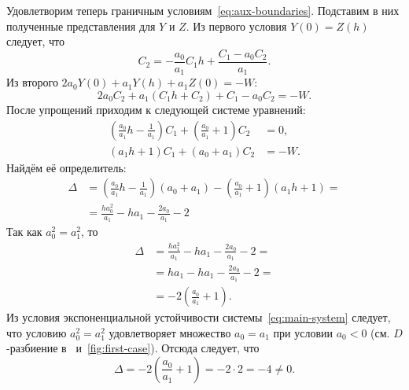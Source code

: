 \documentclass[a4paper,14pt]{article}
\begin{document}
Удовлетворим теперь граничным условиям~\eqref{eq:aux-boundaries}.
Подставим в них полученные представления для $Y$ и $Z$. Из
первого условия $Y(0) = Z(h)$ следует, что
\begin{equation*}
  C_2 =
  - \frac{a_0}{a_1} C_1 h
  + \frac{C_1 - a_0 C_2}{a_1}.
\end{equation*}
Из второго $2 a_0 Y(0) + a_1 Y(h) + a_1 Z(0) = -W$:
\begin{equation*}
  2 a_0 C_2 + a_1 (C_1 h + C_2) + C_1 - a_0 C_2 = -W.
\end{equation*}
После упрощений приходим к следующей системе уравнений:
\begin{equation*}
  \begin{aligned}
    \left(
    \frac{a_0}{a_1} h - \frac{1}{a_1}
    \right) C_1
    + \left(
    \frac{a_0}{a_1} + 1
    \right) C_2 &= 0, \\
    (a_1 h + 1) C_1 + (a_0 + a_1) C_2 &= -W.
  \end{aligned}
\end{equation*}
Найдём её определитель:
\begin{equation*}
  \begin{aligned}
    \Delta
    &=
      \left(
      \frac{a_0}{a_1} h - \frac{1}{a_1}
      \right)
      (a_0 + a_1)
      -
      \left(
      \frac{a_0}{a_1} + 1
      \right)
      (a_1 h + 1) = \\
    &=
      \frac{h a_0^2}{a_1} - h a_1
      - \frac{2 a_0}{a_1} - 2
  \end{aligned}
\end{equation*}
Так как $a_0^2 = a_1^2$, то
\begin{equation*}
  \begin{aligned}
    \Delta
    &=
      \frac{h a_1^2}{a_1} - h a_1
      - \frac{2 a_0}{a_1} - 2 = \\
    &=
      h a_1 - h a_1 - \frac{2 a_0}{a_1} - 2 = \\
    &=
      - 2 \left(
      \frac{a_0}{a_1} + 1
      \right).
  \end{aligned}
\end{equation*}
Из условия экспоненциальной устойчивости системы~\eqref{eq:main-system} следует,
что условию $a_0^2 = a_1^2$ удовлетворяет множество $a_0 = a_1$ при условии
$a_0 < 0$ (см. $D$-разбиение в~\cite[стр.~126]{elsgolc1971}
и~\autoref{fig:first-case}). Отсюда следует, что
\begin{equation*}
  \Delta
  =
  - 2 \left(
    \frac{a_0}{a_1} + 1
  \right)
  =
  -2 \cdot 2 = -4 \neq 0.
\end{equation*}
\end{document}
